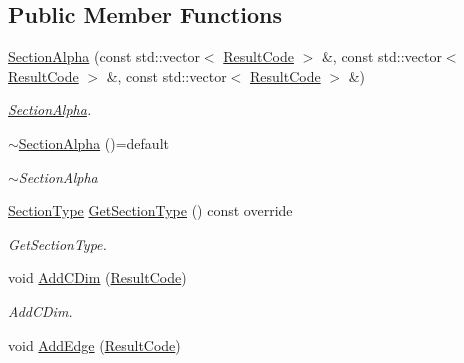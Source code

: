 \subsection*{Public Member Functions}
\begin{DoxyCompactItemize}
\item 
\hyperlink{classdata__model_1_1_section_alpha_ab2303128daa08e59096fb0914f44f832}{Section\+Alpha} (const std\+::vector$<$ \hyperlink{structdata__model_1_1_result_code}{Result\+Code} $>$ \&, const std\+::vector$<$ \hyperlink{structdata__model_1_1_result_code}{Result\+Code} $>$ \&, const std\+::vector$<$ \hyperlink{structdata__model_1_1_result_code}{Result\+Code} $>$ \&)\hypertarget{classdata__model_1_1_section_alpha_ab2303128daa08e59096fb0914f44f832}{}\label{classdata__model_1_1_section_alpha_ab2303128daa08e59096fb0914f44f832}

\begin{DoxyCompactList}\small\item\em \hyperlink{classdata__model_1_1_section_alpha}{Section\+Alpha}. \end{DoxyCompactList}\item 
\hyperlink{classdata__model_1_1_section_alpha_aefb4dc9b6b518dcd07047f7deab7766c}{$\sim$\+Section\+Alpha} ()=default\hypertarget{classdata__model_1_1_section_alpha_aefb4dc9b6b518dcd07047f7deab7766c}{}\label{classdata__model_1_1_section_alpha_aefb4dc9b6b518dcd07047f7deab7766c}

\begin{DoxyCompactList}\small\item\em $\sim$\+Section\+Alpha \end{DoxyCompactList}\item 
\hyperlink{classdata__model_1_1_section_acba8f1759f6c20b81bed2d4a1178a155}{Section\+Type} \hyperlink{classdata__model_1_1_section_alpha_a41b854bb12eeb3ac31ccf1f6064fbf46}{Get\+Section\+Type} () const override
\begin{DoxyCompactList}\small\item\em Get\+Section\+Type. \end{DoxyCompactList}\item 
void \hyperlink{classdata__model_1_1_section_alpha_ac75f740b6bee40f4f154792c2ee2f79d}{Add\+C\+Dim} (\hyperlink{structdata__model_1_1_result_code}{Result\+Code})\hypertarget{classdata__model_1_1_section_alpha_ac75f740b6bee40f4f154792c2ee2f79d}{}\label{classdata__model_1_1_section_alpha_ac75f740b6bee40f4f154792c2ee2f79d}

\begin{DoxyCompactList}\small\item\em Add\+C\+Dim. \end{DoxyCompactList}\item 
void \hyperlink{classdata__model_1_1_section_alpha_ad39e907fadc2c3ec712d6bb19b78ca99}{Add\+Edge} (\hyperlink{structdata__model_1_1_result_code}{Result\+Code})\hypertarget{classdata__model_1_1_section_alpha_ad39e907fadc2c3ec712d6bb19b78ca99}{}\label{classdata__model_1_1_section_alpha_ad39e907fadc2c3ec712d6bb19b78ca99}


\end{DoxyCompactItemize}
